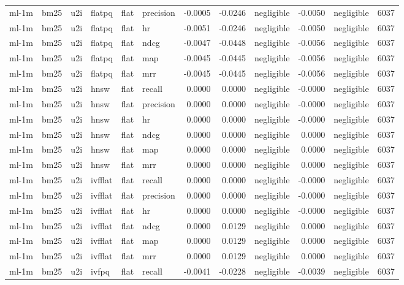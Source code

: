 \begin{tabular}{llllllrrlrlr}
ml-1m & bm25 & u2i & flatpq & flat & precision & -0.0005 & -0.0246 & negligible & -0.0050 & negligible & 6037 \\
ml-1m & bm25 & u2i & flatpq & flat & hr & -0.0051 & -0.0246 & negligible & -0.0050 & negligible & 6037 \\
ml-1m & bm25 & u2i & flatpq & flat & ndcg & -0.0047 & -0.0448 & negligible & -0.0056 & negligible & 6037 \\
ml-1m & bm25 & u2i & flatpq & flat & map & -0.0045 & -0.0445 & negligible & -0.0056 & negligible & 6037 \\
ml-1m & bm25 & u2i & flatpq & flat & mrr & -0.0045 & -0.0445 & negligible & -0.0056 & negligible & 6037 \\
ml-1m & bm25 & u2i & hnsw & flat & recall & 0.0000 & 0.0000 & negligible & -0.0000 & negligible & 6037 \\
ml-1m & bm25 & u2i & hnsw & flat & precision & 0.0000 & 0.0000 & negligible & -0.0000 & negligible & 6037 \\
ml-1m & bm25 & u2i & hnsw & flat & hr & 0.0000 & 0.0000 & negligible & -0.0000 & negligible & 6037 \\
ml-1m & bm25 & u2i & hnsw & flat & ndcg & 0.0000 & 0.0000 & negligible & 0.0000 & negligible & 6037 \\
ml-1m & bm25 & u2i & hnsw & flat & map & 0.0000 & 0.0000 & negligible & 0.0000 & negligible & 6037 \\
ml-1m & bm25 & u2i & hnsw & flat & mrr & 0.0000 & 0.0000 & negligible & 0.0000 & negligible & 6037 \\
ml-1m & bm25 & u2i & ivfflat & flat & recall & 0.0000 & 0.0000 & negligible & -0.0000 & negligible & 6037 \\
ml-1m & bm25 & u2i & ivfflat & flat & precision & 0.0000 & 0.0000 & negligible & -0.0000 & negligible & 6037 \\
ml-1m & bm25 & u2i & ivfflat & flat & hr & 0.0000 & 0.0000 & negligible & -0.0000 & negligible & 6037 \\
ml-1m & bm25 & u2i & ivfflat & flat & ndcg & 0.0000 & 0.0129 & negligible & 0.0000 & negligible & 6037 \\
ml-1m & bm25 & u2i & ivfflat & flat & map & 0.0000 & 0.0129 & negligible & 0.0000 & negligible & 6037 \\
ml-1m & bm25 & u2i & ivfflat & flat & mrr & 0.0000 & 0.0129 & negligible & 0.0000 & negligible & 6037 \\
ml-1m & bm25 & u2i & ivfpq & flat & recall & -0.0041 & -0.0228 & negligible & -0.0039 & negligible & 6037 \\

\end{tabular}
